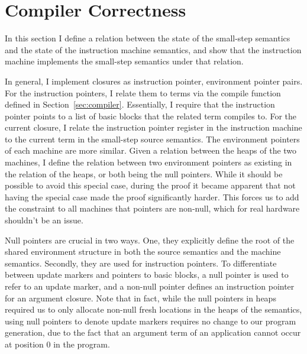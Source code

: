 \section{Compiler Correctness} \label{sec:correctness}

In this section I define a relation between the state of the small-step
semantics and the state of the instruction machine semantics, and show that the
instruction machine implements the small-step semantics under that relation. 

In general, I implement closures as instruction pointer, environment pointer
pairs. For the instruction pointers, I relate them to terms via the compile
function defined in Section~\ref{sec:compiler}. Essentially, I require that the
instruction pointer points to a list of basic blocks that the related term
compiles to. For the current closure, I relate the instruction pointer register
in the instruction machine to the current term in the small-step source
semantics. The environment pointers of each machine are more similar. Given a
relation between the heaps of the two machines, I define the relation between
two environment pointers as existing in the relation of the heaps, or both being
the null pointers. While it should be possible to avoid this special case,
during the proof it became apparent that not having the special case made the
proof significantly harder. This forces us to add the constraint to all machines
that pointers are non-null, which for real hardware shouldn't be an issue.  

Null pointers are crucial in two ways. One, they explicitly define the root
of the shared environment structure in both the source semantics and the machine
semantics. Secondly, they are used for instruction pointers. To differentiate
between update markers and pointers to basic blocks, a null pointer is used to
refer to an update marker, and a non-null pointer defines an instruction pointer
for an argument closure. Note that in fact, while the null pointers in heaps
required us to only allocate non-null fresh locations in the heaps of the \ce
semantics, using null pointers to denote update markers requires no change to
our program generation, due to the fact that an argument term of an
application cannot occur at position 0 in the program.


